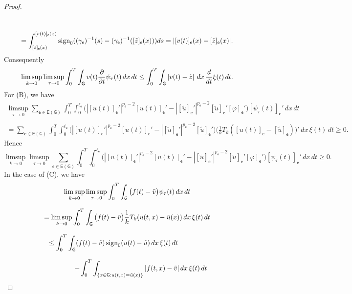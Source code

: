 \documentclass[reqno,12pt]{amsart}
\def\e{\mathsf{e}} 	%
\newcommand{\G}{\mathsf{G}}	%
\newcommand{\E}{\mathsf{E}}	%
\numberwithin{equation}{section} %
\begin{document}
\begin{proof}
$$\begin{array}{c}
\\ \\ \displaystyle
=  \int_{[\tilde z]_\e(x)}^{[v(t)]_\e (x)}  \hbox{sign}_0 ((\gamma_\e)^{-1}(s)- (\gamma_\e)^{-1}([\tilde z]_\e(x))) ds = \vert [v(t)]_\e (x) -  [\tilde z]_\e(x) \vert.
\end{array}
$$
Consequently
\begin{equation}\label{e1A}
 \displaystyle 
   \displaystyle \limsup_{k\to 0}\limsup_{\tau\to 0}\int_0^T \int_\G v(t) \frac{\partial}{\partial t} \psi_\tau(t)\,dx\, dt \leq  \int_0^T \int_\G  \vert v(t) - \tilde{z} \vert \,  \,dx\, \frac{d}{dt}\xi(t)\,dt.
\end{equation}
For (B), we have
$$ \begin{array}{ll}
  \displaystyle\limsup_{\tau\to 0}  \sum_{\e \in\E(\G)}\int_0^T  \int_{0}^{\ell_\e}\Big(|[u(t)]_\e'|^{p_\e-2}[u(t)]_\e'-|[\tilde{u}]_\e'|^{p_\e-2}[\tilde{u}]_\e' [\varphi]_\e' \Big)[\psi_\tau(t)]_\e'  \,dx\, dt\\ \\ 
    \displaystyle=\sum_{\e \in\E(\G)}\int_0^T  \int_{0}^{\ell_\e}\Big(|[u(t)]_\e'|^{p_\e-2}[u(t)]_\e'-|[\tilde{u}]_\e'|^{p_\e-2}[\tilde{u}]_\e'   \Big)\Big(\frac{1}{k}T_k([u(t)]_\e-[\tilde{u}]_\e)\Big)'\,dx\,\xi(t)\,dt\ge 0.
  \end{array}
$$
Hence
\begin{equation}\label{e1B}
\limsup_{k\to 0}\limsup_{\tau\to 0}\sum_{\e \in\E(\G)}\int_0^T  \int_{0}^{\ell_\e}\Big(|[u(t)]_\e'|^{p_\e-2}[u(t)]_\e'-|[\tilde{u}]_\e'|^{p_\e-2}[\tilde{u}]_\e' [\varphi]_\e' \Big)[\psi_\tau(t)]_\e'  \,dx\, dt \geq 0.
\end{equation}
In the case of (C), we have
\begin{equation}\label{e1C}\begin{array}{c}  
  \displaystyle\limsup_{k\to 0}\limsup_{\tau\to 0}\int_0^T \int_{\G} \big(f(t)-\tilde v\big) \psi_\tau(t)\,dx\, dt\\ 
  \\  \displaystyle=
  \limsup_{k\to 0}\int_0^T \int_{\G} \big(f(t)-\tilde v\big) \frac{1}{k}T_k(u(t,x)-\tilde u(x))\,dx\, \xi(t)\,dt\\ \\
     \displaystyle \le \int_0^T \int_\G (f(t)- \tilde{v}) \, \hbox{sign}_0 ( u(t)- \tilde u) \,  dx \,  \xi(t)\,dt \qquad\qquad \\ \\ 
      \displaystyle \qquad\qquad + \int_0^T\int_{\{x\in\G:u(t,x) = \tilde u(x) \}} \vert  f(t,x)- \tilde{v} \vert \, dx\, \xi(t)\,dt

\end{array}
\end{equation}
\end{proof}
\end{document}
